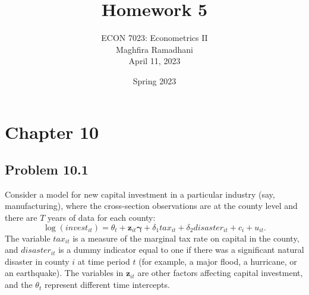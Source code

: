 \documentclass[10pt]{article}
\begin{document}
 
\title{Homework 5}
\author{ECON 7023: Econometrics II\\
Maghfira Ramadhani\\
April 11, 2023}
\date{Spring 2023}
\maketitle

\section*{Chapter 10}
\subsection*{Problem 10.1}
Consider a model for new capital investment in a particular industry (say, manufacturing), where the cross-section observations are at the county level and there are $T$ years of data for each county:
\[\log(invest_{it})=\theta_t+\textbf{z}_{it}\pmb{\gamma}+\delta_1 tax_{it}+\delta_2 disaster_{it}+c_i+u_{it}.\]
The variable $tax_{it}$ is a measure of the marginal tax rate on capital in the county, and $disaster_{it}$ is a dummy indicator equal to one if there was a significant natural disaster in county $i$ at time period $t$ (for example, a major flood, a hurricane, or an earthquake). The variables in $\textbf{z}_{it}$ are other factors affecting capital investment, and the $\theta_t$ represent different time intercepts. 
\end{document}
